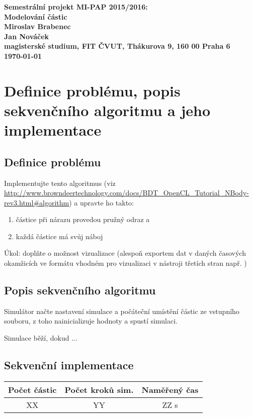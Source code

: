 \documentclass[12pt]{article}
\begin{document}
\begin{center}
\bf Semestrální projekt MI-PAP 2015/2016:\\[5mm]
    Modelování částic\\[5mm]
       Miroslav Brabenec\\
       Jan Nováček\\[2mm]
magisterské studium, FIT ČVUT, Thákurova 9, 160 00 Praha 6\\[2mm]
\today
\end{center}
%
%
%
%
%
\section{Definice problému, popis sekvenčního algoritmu a jeho implementace}

\subsection{Definice problému}
Implementujte tento algoritmus (viz \url{http://www.browndeertechnology.com/docs/BDT_OpenCL_Tutorial_NBody-rev3.html#algorithm}) a upravte ho takto:

\begin{enumerate}
\item	částice při nárazu provedou pružný odraz a
\item	každá částice má svůj náboj
\end{enumerate}

Úkol: doplňte o možnost vizualizace (alespoň exportem dat v daných časových okamžicích ve formátu vhodném pro vizualizaci v nástroji třetích stran např. ) 

\subsection{Popis sekvenčního algoritmu}
Simulátor načte nastavení simulace a počáteční umístění částic ze vstupního souboru, z toho nainicializuje hodnoty a spustí simulaci.

Simulace běží, dokud ...

\subsection{Sekvenční implementace}

\begin{center}
\begin{tabular}{c | c | c}
\textbf{Počet částic} & \textbf{Počet kroků sim.}  & \textbf{Naměřený čas} \\ \hline \hline
XX & YY & ZZ s \\ \hline
\end{tabular}
\end{center}
\end{document}
